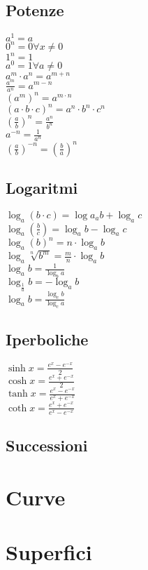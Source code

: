 \documentclass[a4paper,12pt]{article}
\theoremstyle{mystyle}
\begin{document}
\subsection{Potenze}
\(a^1=a\)\\
\(0^n=0 \forall x \neq 0\)\\
\(1^n = 1\)\\
\(a^0=1 \forall a \neq 0\)\\
\(a^m \cdot a^n = a^{m+n}\)\\
\(\frac{a^m}{a^n}=a^{m-n}\)\\
\((a^m)^n=a^{m \cdot n}\)\\
\((a\cdot b \cdot c)^n=a^n \cdot b^n \cdot c^n\)\\
\(\left(\frac{a}{b} \right) ^n =\frac{a^n}{b^n}\)\\
\(a^{-n}=\frac{1}{a^n}\)\\
\(\left(\frac{a}{b}\right) ^{-n} = \left (\frac{b}{a}\right)^n\)

\subsection{Logaritmi}
\(\log_a (b \cdot c) = \log a_a b + \log_a c\)\\
\(\log_a \left (\frac{b}{c}\right ) = \log_a b - \log_a c\)\\
\(\log_a (b)^n = n \cdot \log_a b\)\\
\(\log_a \sqrt[n]{b^m} = \frac{m}{n} \cdot \log_a b\)\\
\(\log_a b = \frac{1}{\log_b a}\)\\
\(\log_{\frac{1}{a}} b = -\log_a b \)\\
\(\log_a b = \frac{\log_c b}{\log_c a}\)

\subsection{Iperboliche}

\(\sinh x = \frac{e^x-e^{-x}}{2}\) \\
\(\cosh x = \frac{e^x + e^{-x}}{2}\) \\
\(\tanh x = \frac{e^x-e^{-x}}{e^x+e^{-x}}\) \\
\(\coth x = \frac{e^x+e^{-x}}{e^x-e^{-x}}\)

\subsection{Successioni}

\section{Curve}

\section{Superfici}
\end{document}
